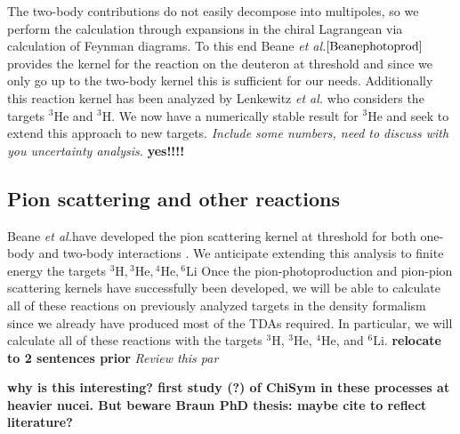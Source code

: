 \documentclass[a4paper,11pt]{article}
\newcommand{\etal}{\textit{et al.}}
\newcommand{\LiS}{{}^{6} \mathrm{Li} }
\newcommand{\HeF}{{}^{4} \mathrm{He}}
\newcommand{\HeT}{{}^{3} \mathrm{He}}
\newcommand{\HThree}{{}^{3} \mathrm{H}}
\newcommand{\ques}[1]{\color{red}\textit{ #1 }\color{black}}
\newcommand{\com}[1]{\color{blue}\small\textbf{ #1 }\color{black}\normalsize}
\begin{document}
The two-body contributions do not easily decompose into multipoles, so we perform the calculation through expansions
in the chiral Lagrangean via calculation of Feynman diagrams.
To this end Beane \etal $\cite{Beanephotoprod}$ provides the kernel for the reaction on the deuteron at threshold
and since we only go up to the two-body kernel this is sufficient for our needs.
Additionally this reaction kernel has been analyzed by
Lenkewitz \etal \cite{L2011, L2013} who considers the targets $\HeT$ and $\HThree$.
We now have a numerically stable result for $\HeT$ and seek to extend
this approach to new targets.
\ques{Include some numbers, need to discuss with you uncertainty analysis.} \com{yes!!!!}


\subsection{Pion scattering and other reactions}
Beane \etal have developed the pion scattering kernel at threshold for both
one-body and two-body interactions \cite{Beane2003}.
We anticipate extending this analysis to finite energy the targets $\HThree, \HeT, \HeF, \LiS$
Once the pion-photoproduction and pion-pion scattering kernels have
successfully been developed, we will be able to calculate all of
these reactions on previously analyzed targets in the density
formalism since we already have produced most of the TDAs required.
In particular, we will calculate all of these reactions with the
targets $\HThree$, $\HeT$, $\HeF$, and $\LiS$. \com{relocate to 2 sentences prior}
\ques{Review this par}

\com{why is this interesting? first study (?) of ChiSym in these processes at heavier nucei. But beware Braun PhD thesis: maybe cite to reflect literature?}

\end{document}
